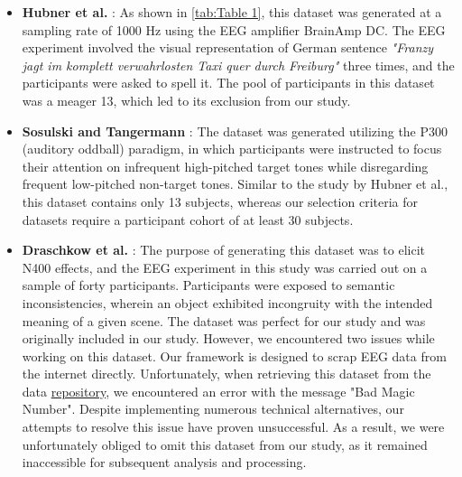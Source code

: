 \begin{itemize}
\item \textbf{Hubner et al.} \cite{hubner2017learning}: As shown in \autoref{tab:Table 1}, this dataset was generated at a sampling rate of 1000 Hz using the EEG amplifier BrainAmp DC. The EEG experiment involved the visual representation of German sentence \textit{"Franzy jagt im komplett verwahrlosten Taxi quer durch Freiburg"} three times, and the participants were asked to spell it. The pool of participants in this dataset was a meager 13, which led to its exclusion from our study.  

\item \textbf{Sosulski and Tangermann} \cite{sosulski2019spatial}: The dataset was generated utilizing the P300 (auditory oddball) paradigm, in which participants were instructed to focus their attention on infrequent high-pitched target tones while disregarding frequent low-pitched non-target tones.  Similar to the study by Hubner et al., this dataset contains only 13 subjects, whereas our selection criteria for datasets require a participant cohort of at least 30 subjects.  


\item \textbf{Draschkow et al.} \cite{draschkow2018no}: The purpose of generating this dataset was to elicit N400 effects, and the EEG experiment in this study was carried out on a sample of forty participants. Participants were exposed to semantic inconsistencies, wherein an object exhibited incongruity with the intended meaning of a given scene. The dataset was perfect for our study and was originally included in our study. However, we encountered two issues while working on this dataset. Our framework is designed to scrap EEG data from the internet directly. Unfortunately, when retrieving this dataset from the data \href{https://zenodo.org/record/1421347#.YotDnBNBy3I}{repository},  %
we encountered an error with the message "Bad Magic Number". Despite implementing numerous technical alternatives, our attempts to resolve this issue have proven unsuccessful. As a result, we were unfortunately obliged to omit this dataset from our study, as it remained inaccessible for subsequent analysis and processing. 


\end{itemize}
